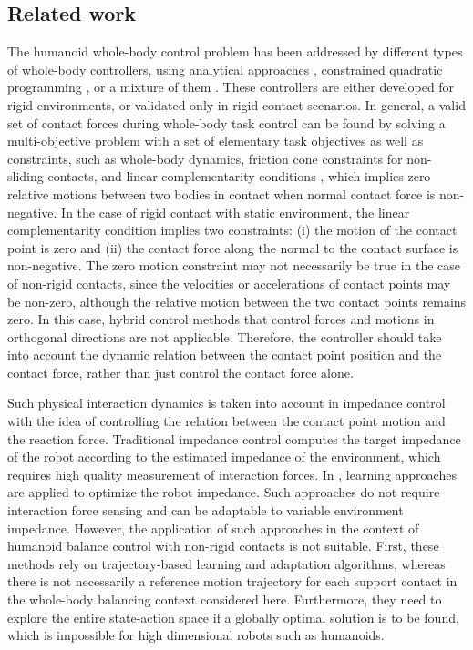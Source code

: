 \documentclass[letterpaper, 10 pt, conference]{ieeeconf}  %
\begin{document}
\subsection{Related work}
The humanoid whole-body control problem has been addressed by different types of whole-body controllers, using analytical approaches \cite{Khatib08,Sentis10,Righetti13}, constrained quadratic programming \cite{Abe07,Liu11,Salini13,Saab13}, or a mixture of them \cite{Stephens10,Nori15}. These controllers are either developed for rigid environments, or validated only in rigid contact scenarios.
In general, a valid set of contact forces during whole-body task control can be found by solving a multi-objective problem with a set of elementary task objectives as well as constraints, such as whole-body dynamics, friction cone constraints for non-sliding contacts, and linear complementarity conditions \cite{Muico09,Saab13,Salini13}, which implies zero relative motions between two bodies in contact when normal contact force is non-negative. In the case of rigid contact with static environment, the linear complementarity condition implies two constraints: (i) the motion of the contact point is zero and (ii) the contact force along the normal to the contact surface is non-negative.  The zero motion constraint may not necessarily be true in the case of non-rigid contacts, since the velocities or accelerations of contact points may be non-zero, although the relative motion between the two contact points remains zero. In this case, hybrid control methods \cite{khatib87} that control forces and motions in orthogonal directions are not applicable. Therefore, the controller should take into account the dynamic relation between the contact point position and the contact force, rather than just control the contact force alone. 

Such physical interaction dynamics is taken into account in impedance control \cite{Hogan85} with the idea of controlling the relation between the contact point motion and the reaction force. Traditional impedance control \cite{Hogan85,Love95,Tsumugiwa02} computes the target impedance of the robot according to the estimated impedance of the environment, which requires high quality measurement of interaction forces. In \cite{Buchli10, Yang11}, learning approaches are applied to optimize the robot impedance. Such approaches do not require interaction force sensing and can be adaptable to variable environment impedance. However, the application of such approaches in the context of humanoid balance control with non-rigid contacts is not suitable. First, these methods rely on trajectory-based learning and adaptation algorithms, whereas there is not necessarily a reference motion trajectory for each support contact in the whole-body balancing context considered here. Furthermore, they need to explore the entire state-action space if a globally optimal solution is to be found, which is impossible for high dimensional robots such as humanoids.
\end{document}

